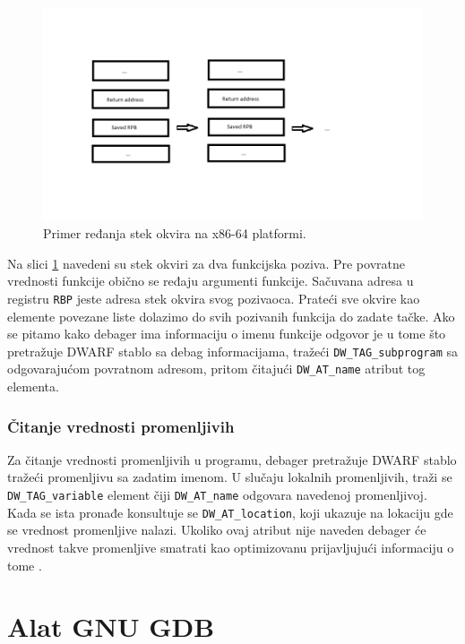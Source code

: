 \documentclass[12pt,oneside]{memoir}
\begin{document}
\begin{figure}[h!]
	\begin{center}
		\includegraphics[scale=0.6]{slike/stack_frame.png}
	\end{center}
	\caption{Primer ređanja stek okvira na x86-64 platformi.}
	\label{fig:stack}
\end{figure}

Na slici \ref{fig:stack} navedeni su stek okviri za dva funkcijska poziva. Pre povratne vrednosti funkcije obično se ređaju argumenti funkcije. Sačuvana adresa u registru \texttt{RBP} jeste adresa stek okvira svog pozivaoca. Prateći sve okvire kao elemente povezane liste dolazimo do svih pozivanih funkcija do zadate tačke. Ako se pitamo kako debager ima informaciju o imenu funkcije odgovor je u tome što pretražuje DWARF stablo sa debag informacijama, tražeći \texttt{DW\_TAG\_subprogram} sa odgovarajućom povratnom adresom, pritom čitajući \texttt{DW\_AT\_name} atribut tog elementa.

\subsection{Čitanje vrednosti promenljivih}

Za čitanje vrednosti promenljivih u programu, debager pretražuje DWARF stablo tražeći promenljivu sa zadatim imenom. U slučaju lokalnih promenljivih, traži se \texttt{DW\_TAG\_variable} element čiji \texttt{DW\_AT\_name} odgovara navedenoj promenljivoj. Kada se ista pronađe konsultuje se \texttt{DW\_AT\_location}, koji ukazuje na lokaciju gde se vrednost promenljive nalazi. Ukoliko ovaj atribut nije naveden debager će vrednost takve promenljive smatrati kao optimizovanu prijavljujući informaciju o tome \cite{GDB}.

\chapter{Alat GNU GDB}
\label{chp:GDB}
\end{document}
